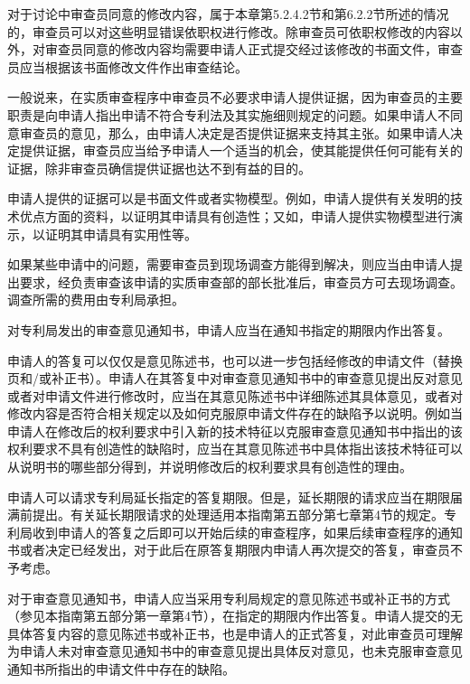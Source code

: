 对于讨论中审查员同意的修改内容，属于本章第5.2.4.2节和第6.2.2节所述的情况的，审查员可以对这些明显错误依职权进行修改。除审查员可依职权修改的内容以外，对审查员同意的修改内容均需要申请人正式提交经过该修改的书面文件，审查员应当根据该书面修改文件作出审查结论。

一般说来，在实质审查程序中审查员不必要求申请人提供证据，因为审查员的主要职责是向申请人指出申请不符合专利法及其实施细则规定的问题。如果申请人不同意审查员的意见，那么，由申请人决定是否提供证据来支持其主张。如果申请人决定提供证据，审查员应当给予申请人一个适当的机会，使其能提供任何可能有关的证据，除非审查员确信提供证据也达不到有益的目的。

申请人提供的证据可以是书面文件或者实物模型。例如，申请人提供有关发明的技术优点方面的资料，以证明其申请具有创造性；又如，申请人提供实物模型进行演示，以证明其申请具有实用性等。

如果某些申请中的问题，需要审查员到现场调查方能得到解决，则应当由申请人提出要求，经负责审查该申请的实质审查部的部长批准后，审查员方可去现场调查。调查所需的费用由专利局承担。

对专利局发出的审查意见通知书，申请人应当在通知书指定的期限内作出答复。

申请人的答复可以仅仅是意见陈述书，也可以进一步包括经修改的申请文件（替换页和/或补正书）。申请人在其答复中对审查意见通知书中的审查意见提出反对意见或者对申请文件进行修改时，应当在其意见陈述书中详细陈述其具体意见，或者对修改内容是否符合相关规定以及如何克服原申请文件存在的缺陷予以说明。例如当申请人在修改后的权利要求中引入新的技术特征以克服审查意见通知书中指出的该权利要求不具有创造性的缺陷时，应当在其意见陈述书中具体指出该技术特征可以从说明书的哪些部分得到，并说明修改后的权利要求具有创造性的理由。

申请人可以请求专利局延长指定的答复期限。但是，延长期限的请求应当在期限届满前提出。有关延长期限请求的处理适用本指南第五部分第七章第4节的规定。专利局收到申请人的答复之后即可以开始后续的审查程序，如果后续审查程序的通知书或者决定已经发出，对于此后在原答复期限内申请人再次提交的答复，审查员不予考虑。

对于审查意见通知书，申请人应当采用专利局规定的意见陈述书或补正书的方式（参见本指南第五部分第一章第4节），在指定的期限内作出答复。申请人提交的无具体答复内容的意见陈述书或补正书，也是申请人的正式答复，对此审查员可理解为申请人未对审查意见通知书中的审查意见提出具体反对意见，也未克服审查意见通知书所指出的申请文件中存在的缺陷。

